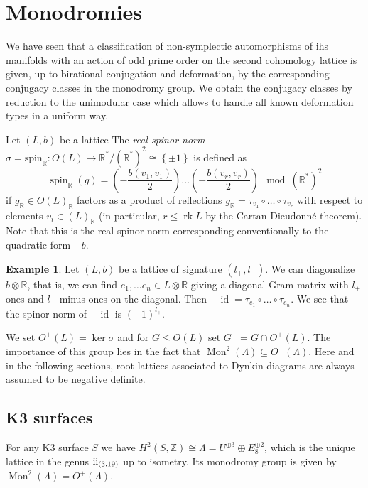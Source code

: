 \documentclass{amsart}
\theoremstyle{definition}
\newtheorem{example}[definition]{Example}
\theoremstyle{plain}
\DeclareMathOperator{\spin}{spin}
\DeclareMathOperator{\rk}{rk}
\DeclareMathOperator{\id}{id}
\DeclareMathOperator{\Mo}{Mon}
\newcommand{\RR}{\mathbb{R}}
\newcommand{\IZ}{\mathbb{Z}}
\newcommand{\RN}[1]{\textup{\uppercase\expandafter{\romannumeral#1}}}
\newcommand{\even}{\RN{2}}
\begin{document}
\section{Monodromies}
We have seen that a classification of non-symplectic automorphisms of ihs manifolds with an action of odd prime order on the second cohomology lattice
is given, up to
birational conjugation and deformation, by the corresponding conjugacy classes in
the monodromy group.
We obtain the conjugacy classes by reduction to the unimodular case which allows to handle all known deformation types
in a uniform way.

Let $(L,b)$ be a lattice
The \emph{real spinor norm} $\sigma=\mbox{spin}_\RR: O(L) \rightarrow \RR^*/\left(\RR^*\right)^2 \cong \left\{ \pm 1\right\}$ is defined as
 \[ \spin_\RR(g) = \left( -\frac{b(v_1, v_1)}{2}\right) \ldots \left( -\frac{b(v_r, v_r)}{2}\right) \mod \left(\RR^*\right)^2\]
 \noindent if $g_\RR \in O(L)_\RR$ factors as a product of reflections $g_\RR = \tau_{v_1} \circ \ldots \circ \tau_{v_r}$ with respect to elements $v_i \in (L)_\RR$ (in particular, $r \leq \rk L$ by the Cartan-Dieudonn\'e theorem). Note that  this is the real spinor norm corresponding conventionally to the quadratic form $-b$.
 \begin{example}
  Let $(L,b)$ be a lattice of signature $(l_+,l_-)$.
  We can diagonalize $b\otimes \RR$, that is, we can find
  $e_1,\dots e_n \in L \otimes \RR$ giving a diagonal Gram matrix with $l_+$ ones and $l_-$ minus ones on the diagonal.
  Then $-\id = \tau_{e_1} \circ \dots \circ \tau_{e_n}$.
  We see that the spinor norm of $-\id$ is $(-1)^{l_+}$.
 \end{example}
We set $O^+(L) = \ker \sigma$ and for $G\leq O(L)$ set $G^+=G \cap O^+(L)$.
The importance of this group lies in the fact that $\Mo^2(\Lambda) \subseteq O^+(\Lambda)$.
Here and in the following sections, root lattices associated to Dynkin diagrams are always assumed to be negative definite.

\subsection{K3 surfaces}
For any K3 surface $S$ we have $H^2(S, \IZ) \cong \Lambda = U^{\oplus 3} \oplus E_8^{\oplus 2}$, which is the unique
lattice in the genus $\even_{(3,19)}$ up to isometry. Its monodromy group is given by $\Mo^2(\Lambda)=O^+(\Lambda)$.
\end{document}
